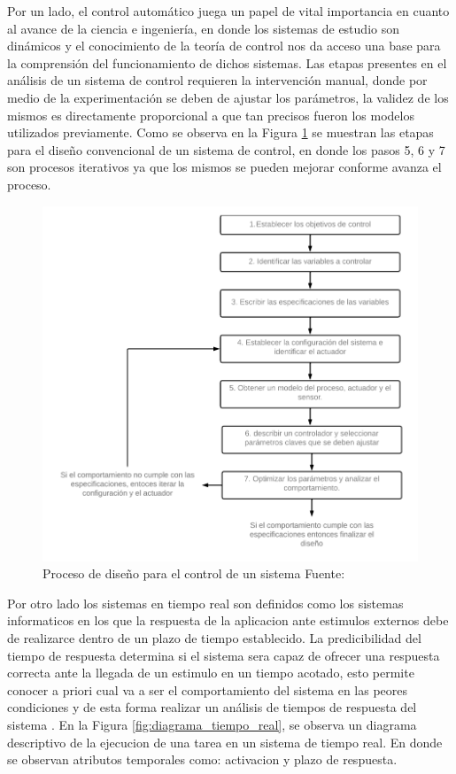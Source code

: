 \documentclass[12pt]{article}
\begin{document}

Por un lado, el control automático juega un papel de vital importancia en cuanto al avance de la ciencia e ingeniería, en donde los sistemas de estudio son dinámicos y el conocimiento de la teoría de control nos da acceso una base para la comprensión del funcionamiento de dichos sistemas. Las etapas presentes en el análisis de un sistema de control requieren la intervención manual, donde por medio de la experimentación se deben de ajustar los parámetros, la validez de los mismos es directamente proporcional a que tan precisos fueron los modelos utilizados previamente. Como se observa en la Figura \ref{fig:diagrama_control} se muestran las etapas para el diseño convencional de un sistema de control, en donde los pasos 5, 6 y 7 son procesos iterativos ya que los mismos se pueden mejorar conforme avanza el proceso. 


\begin{figure}[!ht]
  \centering
  \includegraphics[scale=0.5]{diagramas/diagrama_control.png}
  \caption{Proceso de diseño para el control de un sistema Fuente: \cite{Corvacho}}
  \label{fig:diagrama_control}
\end{figure}


Por otro lado los sistemas en tiempo real son definidos como los sistemas informaticos en los que la respuesta de la aplicacion ante estimulos externos debe de realizarce dentro de un plazo de tiempo establecido. La predicibilidad del tiempo de respuesta determina si el sistema sera capaz de ofrecer una respuesta correcta ante la llegada de un estimulo en un tiempo acotado, esto permite conocer a priori cual va a ser el comportamiento del sistema en las peores condiciones y de esta forma realizar un análisis de tiempos de respuesta del sistema \cite{alonso2010panoramica}. En la Figura \ref{fig:diagrama_tiempo_real}, se observa un diagrama descriptivo de la ejecucion de una tarea en un sistema de tiempo real. En donde se observan atributos temporales como: activacion y plazo de respuesta\cite{de2000introduccion}. 
\end{document}
